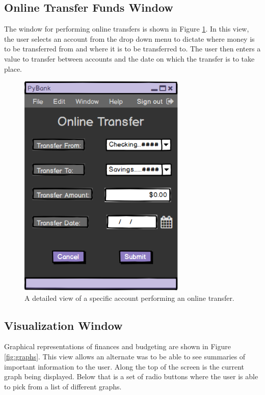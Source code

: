 \newpage

\subsection{Online Transfer Funds Window}
\label{sect:online_transfer_funds}

The window for performing online transfers is shown in Figure \ref{fig:transfer}. In this view, the user selects an account from the drop down menu to dictate where money is to be transferred from and where it is to be transferred to. The user then enters a value to transfer between accounts and the date on which the transfer is to take place.

\FloatBarrier
\begin{figure}[!ht]
    \centering
    \includegraphics[width=8cm]{figures/transfer.png}
    \caption{A detailed view of a specific account performing an online transfer.}
    \label{fig:transfer}
\end{figure}

\newpage

\subsection{Visualization Window}
\label{sect:visualization_window}

Graphical representations of finances and budgeting are shown in Figure \ref{fig:graphs}. This view allows an alternate was to be able to see summaries of important information to the user. Along the top of the screen is the current graph being displayed. Below that is a set of radio buttons where the user is able to pick from a list of different graphs.

